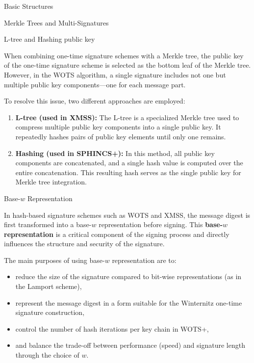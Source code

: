 \documentclass[version=preprint]{iacrcc}
\begin{document}
\begin{section}{Basic Structures}{\label{sec1}}
\begin{subsection}{Merkle Trees and Multi-Signatures}
\end{subsection}

\begin{subsection}{L-tree and Hashing public key}{\label{sec:L-tree}}

    When combining one-time signature schemes with a Merkle tree, the public key of the one-time signature scheme is selected as the bottom leaf of the Merkle tree. However, in the WOTS algorithm, a single signature includes not one but multiple public key components—one for each message part.
    
    To resolve this issue, two different approaches are employed:
    
    \begin{enumerate}
        \item \textbf{L-tree (used in XMSS):} The L-tree is a specialized Merkle tree used to compress multiple public key components into a single public key. It repeatedly hashes pairs of public key elements until only one remains.
    
        \item \textbf{Hashing (used in SPHINCS+):} In this method, all public key components are concatenated, and a single hash value is computed over the entire concatenation. This resulting hash serves as the single public key for Merkle tree integration.
    \end{enumerate}

    
\end{subsection}

\begin{subsection}{Base-\texorpdfstring{$w$}{w} Representation }

In hash-based signature schemes such as WOTS and XMSS, the message digest is first transformed into a base-$w$ representation before signing. This \textbf{base-$w$ representation} is a critical component of the signing process and directly influences the structure and security of the signature.

The main purposes of using base-$w$ representation are to:

\begin{itemize}
    \item reduce the size of the signature compared to bit-wise representations (as in the Lamport scheme),
    \item represent the message digest in a form suitable for the Winternitz one-time signature construction,
    \item control the number of hash iterations per key chain in WOTS+,
    \item and balance the trade-off between performance (speed) and signature length through the choice of $w$.
\end{itemize}


\end{subsection}
\end{section}
\end{document}
